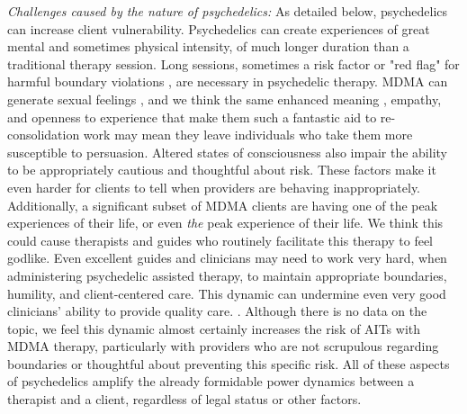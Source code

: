 \documentclass[12pt,letterpaper]{book}
\begin{document}
\textit{Challenges caused by the nature of psychedelics:} As detailed below, psychedelics can increase client vulnerability. Psychedelics can create experiences of great mental and sometimes physical intensity, of much longer duration than a traditional therapy session. Long sessions, sometimes a risk factor or "red flag" for harmful boundary violations \cite{strom1999boundryViolations}, are necessary in psychedelic therapy. MDMA can generate sexual feelings \cite{mcelrath2005sex}, and we think the same enhanced meaning \cite{hartogsohn2018meaning}, empathy, and openness to experience that make them such a fantastic aid to re-consolidation work may mean they leave individuals who take them more susceptible to persuasion. Altered states of consciousness also impair the ability to be appropriately cautious and thoughtful about risk. These factors make it even harder for clients to tell when providers are behaving inappropriately. Additionally, a significant subset of MDMA clients are having one of the peak experiences of their life, or even \textit{the} peak experience of their life. We think this could cause therapists and guides who routinely facilitate this therapy to feel godlike. Even excellent guides and clinicians may need to work very hard, when administering psychedelic assisted therapy, to maintain appropriate boundaries, humility, and client-centered care. This dynamic can undermine even very good clinicians' ability to provide quality care. . Although there is no data on the topic, we feel this dynamic almost certainly increases the risk of AITs with MDMA therapy, particularly with providers who are not scrupulous regarding boundaries or thoughtful about preventing this specific risk. All of these aspects of psychedelics amplify the already formidable power dynamics between a therapist and a client, regardless of legal status or other factors. 
 
\end{document}
